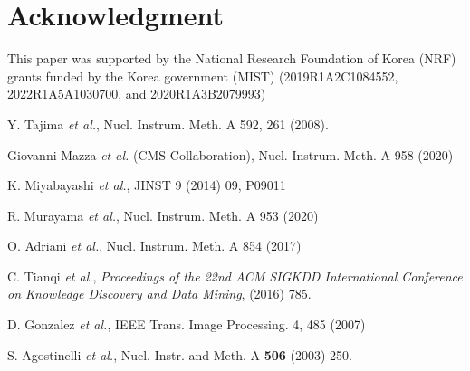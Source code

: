 \documentclass[preprint,12pt,times,a4paper]{elsarticle}
\begin{document}
\label{sec:con}



\section*{Acknowledgment}
This paper was supported by the National Research Foundation of Korea (NRF) grants funded by the Korea government (MIST) (2019R1A2C1084552, \\ 2022R1A5A1030700, and 2020R1A3B2079993)

\begin{thebibliography}{99}
 
Y. Tajima {\it et al.}, Nucl. Instrum. Meth. A 592, 261 (2008).

Giovanni Mazza {\it et al.} (CMS Collaboration), Nucl. Instrum. Meth. A 958 (2020)

K. Miyabayashi {\it et al.}, JINST 9 (2014) 09, P09011

R. Murayama {\it et al.}, Nucl. Instrum. Meth. A 953 (2020) 
 
O. Adriani {\it et al.}, Nucl. Instrum. Meth. A 854 (2017) 

C. Tianqi {\it et al.}, 
{\it Proceedings of the 22nd ACM SIGKDD International Conference on Knowledge Discovery and Data Mining},
(2016) 785.

D. Gonzalez {\it et al.}, IEEE Trans. Image Processing. 4, 485 (2007)

S. Agostinelli {\it et al.},  Nucl. Instr. and Meth. A {\bf 506} (2003) 250.

\end{thebibliography}


%
%

\end{document}
